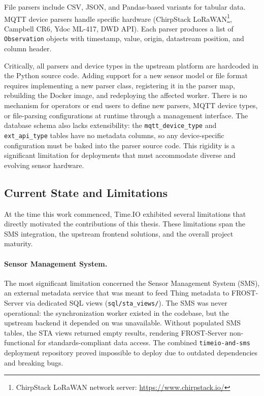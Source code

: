 File parsers include CSV, JSON, and Pandas-based variants for tabular data. MQTT device
parsers handle specific hardware (ChirpStack LoRaWAN\footnote{ChirpStack LoRaWAN network server: \url{https://www.chirpstack.io/}}, Campbell CR6, Ydoc ML-417, DWD API). Each parser
produces a list of \texttt{Observation} objects with timestamp, value, origin, datastream
position, and column header.

Critically, all parsers and device types in the upstream platform are hardcoded in the Python
source code. Adding support for a new sensor model or file format requires implementing a new
parser class, registering it in the parser map, rebuilding the Docker image, and redeploying
the affected worker. There is no mechanism for operators or end users to define new parsers,
MQTT device types, or file-parsing configurations at runtime through a management interface.
The database schema also lacks extensibility: the \texttt{mqtt\_device\_type} and
\texttt{ext\_api\_type} tables have no metadata columns, so any device-specific configuration
must be baked into the parser source code. This rigidity is a significant limitation for
deployments that must accommodate diverse and evolving sensor hardware.

\subsection{Current State and Limitations}
\label{sec:bg-timeio-limitations}

At the time this work commenced, Time.IO exhibited several limitations that directly
motivated the contributions of this thesis. These limitations span the SMS integration, the
upstream frontend solutions, and the overall project maturity.

\paragraph{Sensor Management System.}
The most significant limitation concerned the Sensor Management System (SMS), an external metadata
service that was meant to feed Thing metadata to FROST-Server via dedicated SQL views
(\texttt{sql/sta\_views/}). The SMS was never operational: the synchronization worker existed in the
codebase, but the upstream backend it depended on was unavailable. Without populated SMS tables,
the STA views returned empty results, rendering FROST-Server non-functional for standards-compliant
data access. The combined \texttt{timeio-and-sms} deployment repository proved impossible to deploy
due to outdated dependencies and breaking bugs.

